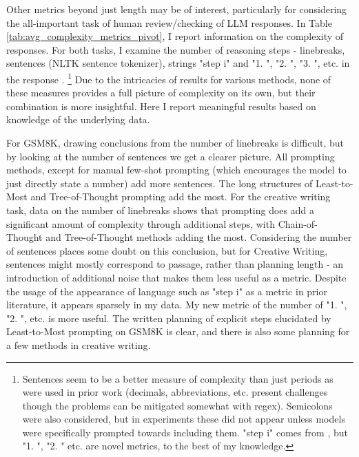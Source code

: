 \documentclass[11pt]{article}
\begin{document}
Other metrics beyond just length may be of interest, particularly for considering the all-important task of human review/checking of LLM responses. In Table \ref{tab:avg_complexity_metrics_pivot}, I report information on the complexity of responses. For both tasks, I examine the number of reasoning steps - linebreaks, sentences (NLTK sentence tokenizer), strings "step i" and "1. ", "2. ", "3. ", etc. in the response \cite{fu_complexity-based_2023}. \footnote{Sentences seem to be a better measure of complexity than just periods as were used in prior work (decimals, abbreviations, etc. present challenges though the problems can be mitigated somewhat with regex). Semicolons were also considered, but in experiments these did not appear unless models were specifically prompted towards including them. "step i" comes from \citealp{fu_complexity-based_2023}, but "1. ", "2. " etc. are novel metrics, to the best of my knowledge.} Due to the intricacies of results for various methods, none of these measures provides a full picture of complexity on its own, but their combination is more insightful. Here I report meaningful results based on knowledge of the underlying data.

For GSM8K, drawing conclusions from the number of linebreaks is difficult, but by looking at the number of sentences we get a clearer picture. All prompting methods, except for manual few-shot prompting (which encourages the model to just directly state a number) add more sentences. The long structures of Least-to-Most and Tree-of-Thought prompting add the most. For the creative writing task, data on the number of linebreaks shows that prompting does add a significant amount of complexity through additional steps, with Chain-of-Thought and Tree-of-Thought methods adding the most. Considering the number of sentences places some doubt on this conclusion, but for Creative Writing, sentences might mostly correspond to passage, rather than planning length - an introduction of additional noise that makes them less useful as a metric. Despite the usage of the appearance of language such as "step i" as a metric in prior literature, it appears sparsely in my data. My new metric of the number of "1. ", "2. ", etc. is more useful. The written planning of explicit steps elucidated by Least-to-Most prompting on GSM8K is clear, and there is also some planning for a few methods in creative writing.
\end{document}
